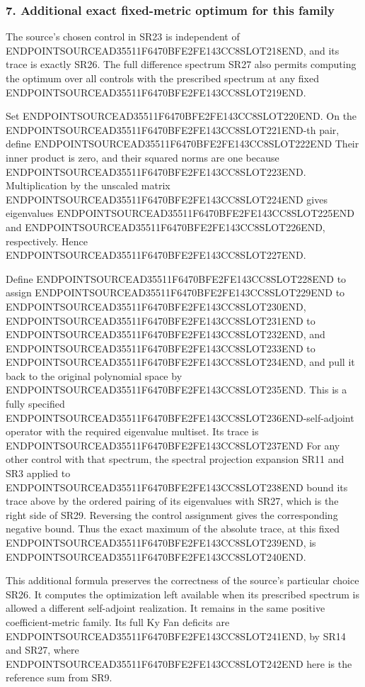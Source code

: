 \subsubsection{7. Additional exact fixed-metric optimum for this family}\label{endpoint-four_window_sharpness_review--additional-exact-fixed-metric-optimum-for-this-family}

The source's chosen control in SR23 is independent of ENDPOINTSOURCEAD35511F6470BFE2FE143CC8SLOT218END, and its trace is exactly SR26. The full difference spectrum SR27 also permits computing the optimum over all controls with the prescribed spectrum at any fixed ENDPOINTSOURCEAD35511F6470BFE2FE143CC8SLOT219END.

Set ENDPOINTSOURCEAD35511F6470BFE2FE143CC8SLOT220END. On the ENDPOINTSOURCEAD35511F6470BFE2FE143CC8SLOT221END-th pair, define ENDPOINTSOURCEAD35511F6470BFE2FE143CC8SLOT222END Their inner product is zero, and their squared norms are one because ENDPOINTSOURCEAD35511F6470BFE2FE143CC8SLOT223END. Multiplication by the unscaled matrix ENDPOINTSOURCEAD35511F6470BFE2FE143CC8SLOT224END gives eigenvalues ENDPOINTSOURCEAD35511F6470BFE2FE143CC8SLOT225END and ENDPOINTSOURCEAD35511F6470BFE2FE143CC8SLOT226END, respectively. Hence ENDPOINTSOURCEAD35511F6470BFE2FE143CC8SLOT227END.

Define ENDPOINTSOURCEAD35511F6470BFE2FE143CC8SLOT228END to assign ENDPOINTSOURCEAD35511F6470BFE2FE143CC8SLOT229END to ENDPOINTSOURCEAD35511F6470BFE2FE143CC8SLOT230END, ENDPOINTSOURCEAD35511F6470BFE2FE143CC8SLOT231END to ENDPOINTSOURCEAD35511F6470BFE2FE143CC8SLOT232END, and ENDPOINTSOURCEAD35511F6470BFE2FE143CC8SLOT233END to ENDPOINTSOURCEAD35511F6470BFE2FE143CC8SLOT234END, and pull it back to the original polynomial space by ENDPOINTSOURCEAD35511F6470BFE2FE143CC8SLOT235END. This is a fully specified ENDPOINTSOURCEAD35511F6470BFE2FE143CC8SLOT236END-self-adjoint operator with the required eigenvalue multiset. Its trace is ENDPOINTSOURCEAD35511F6470BFE2FE143CC8SLOT237END For any other control with that spectrum, the spectral projection expansion SR11 and SR3 applied to ENDPOINTSOURCEAD35511F6470BFE2FE143CC8SLOT238END bound its trace above by the ordered pairing of its eigenvalues with SR27, which is the right side of SR29. Reversing the control assignment gives the corresponding negative bound. Thus the exact maximum of the absolute trace, at this fixed ENDPOINTSOURCEAD35511F6470BFE2FE143CC8SLOT239END, is ENDPOINTSOURCEAD35511F6470BFE2FE143CC8SLOT240END.

This additional formula preserves the correctness of the source's particular choice SR26. It computes the optimization left available when its prescribed spectrum is allowed a different self-adjoint realization. It remains in the same positive coefficient-metric family. Its full Ky Fan deficits are ENDPOINTSOURCEAD35511F6470BFE2FE143CC8SLOT241END, by SR14 and SR27, where ENDPOINTSOURCEAD35511F6470BFE2FE143CC8SLOT242END here is the reference sum from SR9.

